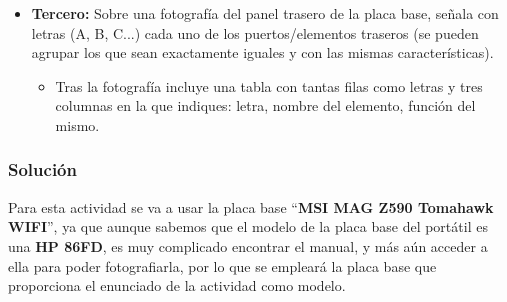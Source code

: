 \begin{itemize}
    \item \textbf{Tercero:} Sobre una fotografía del panel trasero de la placa base, señala con letras (A, B, C...) cada uno de los puertos/elementos traseros (se pueden agrupar los que sean exactamente iguales y con las mismas características).
    \begin{itemize}
        \item
        Tras la fotografía incluye una tabla con tantas filas como letras y tres columnas en la que indiques: letra, nombre del elemento, función del mismo.
    \end{itemize}
\end{itemize}

\subsubsection{Solución}
Para esta actividad se va a usar la placa base ``\textbf{MSI MAG Z590 Tomahawk WIFI}'', ya que aunque sabemos que el modelo de la placa base del portátil es una \textbf{HP 86FD}, es muy complicado encontrar el manual, y más aún acceder a ella para poder fotografiarla, por lo que se empleará la placa base que proporciona el enunciado de la actividad como modelo.

